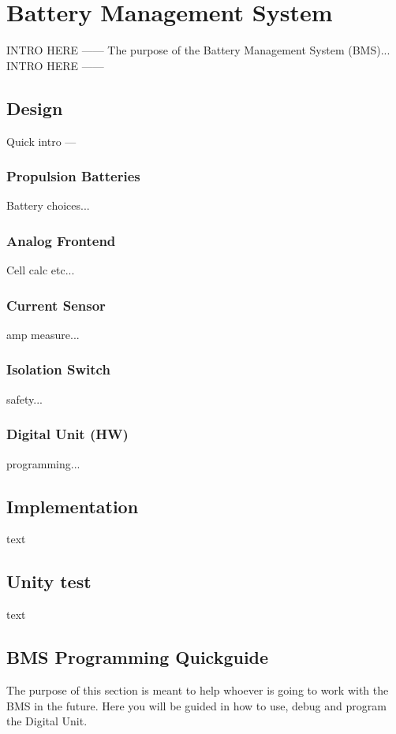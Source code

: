 \section{Battery Management System}
INTRO HERE ------
The purpose of the Battery Management System (BMS)...
INTRO HERE ------

\subsection{Design}
Quick intro --- 

\subsubsection{Propulsion Batteries}
Battery choices...

\subsubsection{Analog Frontend}
Cell calc etc...

\subsubsection{Current Sensor}
amp measure...

\subsubsection{Isolation Switch}
safety...

\subsubsection{Digital Unit (HW)}
programming...


\subsection{Implementation}
text

\subsection{Unity test}
text

\subsection{BMS Programming Quickguide}
The purpose of this section is meant to help whoever is going to work with the BMS in the future. Here you will be guided in how to use, debug and program the Digital Unit.

